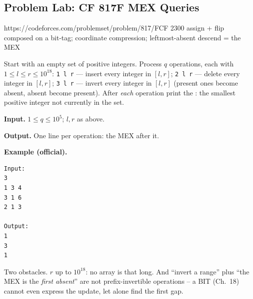 \subsection{Problem Lab: CF 817F MEX Queries}

  {https://codeforces.com/problemset/problem/817/F}{CF 2300}
  {assign + flip composed on a bit-tag; coordinate compression; leftmost-absent descend = the MEX}

\begin{problemstatement}
Start with an empty set of positive integers.  Process \(q\) operations, each with \(1\le l\le r\le 10^{18}\):
\texttt{1 l r} --- insert every integer in \([l,r]\); \texttt{2 l r} --- delete every integer in \([l,r]\); \texttt{3 l r} --- invert every integer in \([l,r]\) (present ones become absent, absent become present).  After \emph{each} operation print the : the smallest positive integer not currently in the set.

\textbf{Input.} \(1\le q\le 10^5\); \(l,r\) as above.

\textbf{Output.} One line per operation: the MEX after it.

\textbf{Example (official).}
\begin{verbatim}
Input:
3
1 3 4
3 1 6
2 1 3

Output:
1
3
1
\end{verbatim}
\end{problemstatement}

\begin{attemptgate}
Two obstacles.  \(r\) up to \(10^{18}\): no array is that long.  And ``invert a range'' plus ``the MEX is the \emph{first absent}'' are not prefix-invertible operations -- a BIT (Ch.~18) cannot even express the update, let alone find the first gap.
\end{attemptgate}

